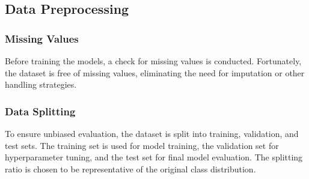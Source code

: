 \documentclass[journal]{IEEEtran}
\begin{document}




\subsection{Data Preprocessing}

\subsubsection{Missing Values}

Before training the models, a check for missing values is conducted. Fortunately, the dataset is free of missing values, eliminating the need for imputation or other handling strategies.

\subsubsection{Data Splitting}

To ensure unbiased evaluation, the dataset is split into training, validation, and test sets. The training set is used for model training, the validation set for hyperparameter tuning, and the test set for final model evaluation. The splitting ratio is chosen to be representative of the original class distribution.
\end{document}
